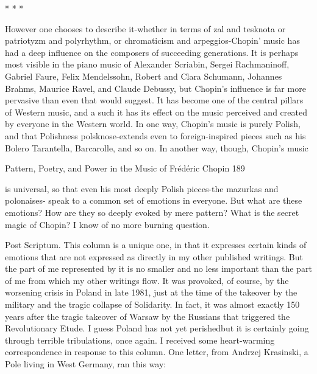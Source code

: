                                              *    *     *

However one chooses to describe it-whether in terms of zal and tesknota or patriotyzm
and polyrhythm, or chromaticism and arpeggios-Chopin' music has had a deep influence
on the composers of succeeding generations. It is perhaps most visible in the piano music
of Alexander Scriabin, Sergei Rachmaninoff, Gabriel Faure, Felix Mendelssohn, Robert
and Clara Schumann, Johannes Brahms, Maurice Ravel, and Claude Debussy, but
Chopin's influence is far more pervasive than even that would suggest. It has become one
of the central pillars of Western music, and a such it has its effect on the music perceived
and created by everyone in the Western world.
In one way, Chopin's music is purely Polish, and that Polishness polsknose-extends even
to foreign-inspired pieces such as his Bolero Tarantella, Barcarolle, and so on. In another
way, though, Chopin's music




Pattern, Poetry, and Power in the Music of Frédéric Chopin                                 189

is universal, so that even his most deeply Polish pieces-the mazurkas and polonaises-
speak to a common set of emotions in everyone. But what are these emotions? How are
they so deeply evoked by mere pattern? What is the secret magic of Chopin? I know of
no more burning question.


Post Scriptum.
This column is a unique one, in that it expresses certain kinds of emotions that are not
expressed as directly in my other published writings. But the part of me represented by it
is no smaller and no less important than the part of me from which my other writings
flow. It was provoked, of course,
by the worsening crisis in Poland in late 1981, just at the time of the takeover by the
military and the tragic collapse of Solidarity. In fact, it was almost exactly 150 years after
the tragic takeover of Warsaw by the Russians that triggered the Revolutionary Etude. I
guess Poland has not yet perishedbut it is certainly going through terrible tribulations,
once again.
I received some heart-warming correspondence in response to this column. One letter,
from Andrzej Krasinski, a Pole living in West Germany, ran this way:

